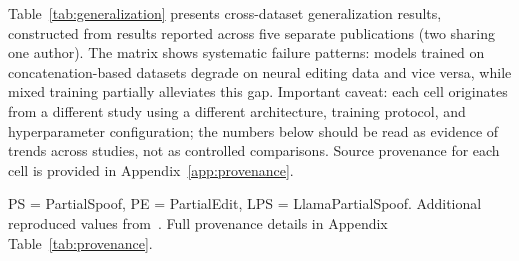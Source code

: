 \documentclass[journal]{IEEEtran}
\begin{document}
Table~\ref{tab:generalization} presents cross-dataset generalization results, constructed from results reported across five separate publications (two sharing one author). The matrix shows systematic failure patterns: models trained on concatenation-based datasets degrade on neural editing data and vice versa, while mixed training partially alleviates this gap. Important caveat: each cell originates from a different study using a different architecture, training protocol, and hyperparameter configuration; the numbers below should be read as evidence of trends across studies, not as controlled comparisons. Source provenance for each cell is provided in Appendix~\ref{app:provenance}.

\begin{table}[t]
\centering
\caption{Cross-dataset generalization results (utterance-level EER\,\%, lower is better). Each row is one train$\rightarrow$test evaluation from a single published study; rows are not directly comparable because they use different architectures, hyperparameters, and training protocols. Shading indicates severity: \colorbox{green!15}{$<$5\%}, \colorbox{yellow!25}{15--25\%}, \colorbox{red!15}{$>$40\%}.}
\label{tab:generalization}
\small
{}
\vspace{2pt}

\raggedright\footnotesize PS = PartialSpoof, PE = PartialEdit, LPS = LlamaPartialSpoof. Additional reproduced values from~\cite{luong2025metrics}. Full provenance details in Appendix Table~\ref{tab:provenance}.
\end{table}
\end{document}
